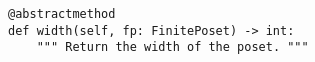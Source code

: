 \begin{verbatim}
@abstractmethod
def width(self, fp: FinitePoset) -> int:
    """ Return the width of the poset. """
\end{verbatim}